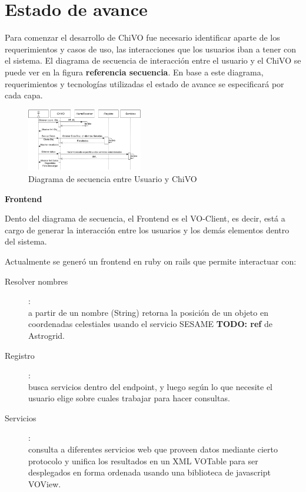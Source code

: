 \section{Estado de avance}

Para comenzar el desarrollo de ChiVO fue necesario identificar aparte de los 
requerimientos y casos de uso, las interacciones que los usuarios iban a tener 
con el sistema. El diagrama de secuencia de interacción entre el usuario y el 
ChiVO se puede ver en la figura \textbf{referencia secuencia}. 
En base a este diagrama, requerimientos y tecnologías utilizadas el estado de 
avance se especificará por cada capa.

\begin{figure}[h]
    \centering
    \includegraphics[width=0.45\textwidth]{images/secuencia.png}
    \caption{Diagrama de secuencia entre Usuario y ChiVO}
    \label{fig:secuencia}
\end{figure}

\textbf{Frontend}

Dento del diagrama de secuencia, el Frontend es el VO-Client, es decir, está a cargo de generar la interacción entre los usuarios y los demás elementos dentro del sistema.

Actualmente se generó un frontend en ruby on rails que permite interactuar con: 
\begin{description}
 \item[Resolver nombres]:\hfill \\
  a partir de un nombre (String) retorna la posición de un objeto en coordenadas celestiales usando el servicio SESAME \textbf{TODO: ref} de Astrogrid.
 \item[Registro]: \hfill \\
 busca servicios dentro del endpoint, y luego según lo que necesite el usuario elige sobre cuales trabajar para hacer consultas. 
 \item[Servicios]: \hfill \\
 consulta a diferentes servicios web que proveen datos mediante cierto protocolo y unifica los resultados en un XML VOTable para ser desplegados en forma ordenada usando una biblioteca de javascript VOView.
\end{description}


